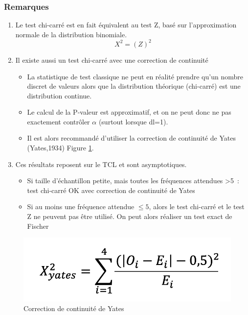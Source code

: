 \subsubsection{Remarques}
\begin{enumerate}
    \item Le test chi-carré est en fait équivalent au test Z, basé sur l’approximation normale de la distribution binomiale.
    $$X^{2} = (Z)^{2}$$
    \item Il existe aussi un test chi-carré avec une correction de continuité
    \begin{itemize}
        \item La statistique de test classique ne peut en réalité prendre qu’un nombre discret de valeurs alors que la distribution théorique (chi-carré) est une distribution continue.
        \item Le calcul de la P-valeur est approximatif, et on ne peut donc ne pas exactement contrôler $\alpha$ (surtout lorsque dl=1).
        \item Il est alors recommandé d’utiliser la correction de continuité de Yates (Yates,1934) Figure \ref{fig:Yates}.
    \end{itemize}
    \item Ces résultats reposent sur le TCL et sont asymptotiques.
    \begin{itemize}
        \item Si taille d’échantillon petite, mais toutes les fréquences attendues >5 : test chi-carré OK avec correction de continuité de Yates
        \item Si au moins une fréquence attendue $\leqslant 5$, alors le test chi-carré et le test Z ne peuvent pas être utilisé. On peut alors réaliser un test exact de Fischer
    \end{itemize}
\end{enumerate}

\begin{figure}[H]
    \centering
    \includegraphics[scale = 0.5]{images/Yates.png}
    \caption{Correction de continuité de Yates}
    \label{fig:Yates}
\end{figure}

